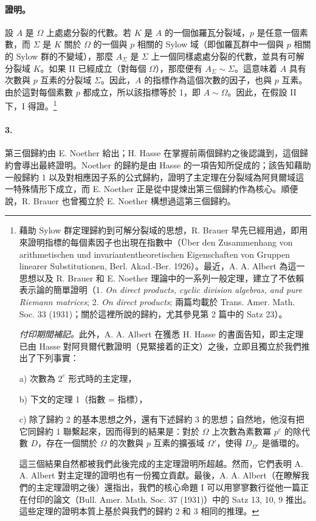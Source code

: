\documentclass[11pt]{article}
\begin{document}
\paragraph{證明。}
設 \(A\) 是 \(\Omega\) 上處處分裂的代數。若 \(K\) 是 \(A\) 的一個伽羅瓦分裂域，\(p\) 是任意一個素數，而 \(\Sigma\) 是 \(K\) 關於 \(\Omega\) 的一個與 \(p\) 相關的 Sylow 域（即伽羅瓦群中一個與 \(p\) 相關的 Sylow 群的不變域），那麼 \(A_{\Sigma}\) 是 \(\Sigma\) 上一個同樣處處分裂的代數，並具有可解分裂域 \(K\)。如果 II 已經成立（對每個 \(\Omega\)），那麼便有 \(A_{\Sigma}\sim \Sigma\)。這意味着 \(A\) 具有次數與 \(p\) 互素的分裂域 \(\Sigma\)。因此，\(A\) 的指標作為這個次數的因子，也與 \(p\) 互素。由於這對每個素數 \(p\) 都成立，所以該指標等於 1，即 \(A\sim\Omega\)。因此，在假設 II 下，I 得證。\footnote{藉助 Sylow 群定理歸約到可解分裂域的思想，R. Brauer 早先已經用過，即用來證明指標的每個素因子也出現在指數中（Über den Zusammenhang von arithmetischen und invariantentheoretischen Eigenschaften von Gruppen linearer Substitutionen, Berl. Akad.-Ber. 1926）。最近，A. A. Albert 為這一思想以及 R. Brauer 和 E. Noether 理論中的一系列一般定理，建立了不依賴表示論的簡單證明（1. \emph{On direct products, cyclic division algebras, and pure Riemann matrices}; 2. \emph{On direct products}; 兩篇均載於 Trans. Amer. Math. Soc. 33 (1931)；關於這裡所說的歸約，尤其參見第 2 篇中的 Satz 23）。

\emph{付印期間補記。}此外，A. A. Albert 在獲悉 H. Hasse 的書面告知，即主定理已由 Hasse 對阿貝爾代數證明（見緊接着的正文）之後，立即且獨立於我們推出了下列事實：

a) 次數為 \(2^e\) 形式時的主定理，

b) 下文的定理 1（指數 = 指標），

c) 除了歸約 2 的基本思想之外，還有下述歸約 3 的思想；自然地，他沒有把它同歸約 1 聯繫起來，因而得到的結果是：對於 \(\Omega\) 上次數為素數冪 \(p^e\) 的除代數 \(D\)，存在一個關於 \(\Omega\) 的次數與 \(p\) 互素的擴張域 \(\Omega'\)，使得 \(D_{\Omega'}\) 是循環的。

這三個結果自然都被我們此後完成的主定理證明所超越。然而，它們表明 A. A. Albert 對主定理的證明也有一份獨立貢獻。最後，A. A. Albert（在瞭解我們的主定理證明之後）還指出，我們的核心命題 I 可以用寥寥數行從他一篇正在付印的論文（Bull. Amer. Math. Soc. 37 (1931)）中的 Satz 13, 10, 9 推出。這些定理的證明本質上基於與我們的歸約 2 和 3 相同的推理。}

\paragraph{3.}
第三個歸約由 E. Noether 給出；H. Hasse 在掌握前兩個歸約之後認識到，這個歸約會導出最終證明。Noether 的歸約是由 Hasse 的一項告知所促成的；該告知藉助一般歸約 1 以及對相應因子系的公式歸約，證明了主定理在分裂域為阿貝爾域這一特殊情形下成立，而 E. Noether 正是從中提煉出第三個歸約作為核心。順便說，R. Brauer 也曾獨立於 E. Noether 構想過這第三個歸約。
\end{document}
